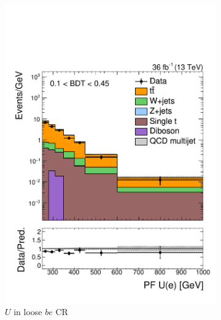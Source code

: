 \begin{figure}[]
    \begin{center}
        \begin{subfigure}[t]{0.32\textwidth}
            \includegraphics[width=\textwidth]{figures/monotop/prefit/singleelectrontop_loose_pfUWmag_logy.pdf}
            \caption{$U$ in loose $be$ CR}
        \end{subfigure}
        \begin{subfigure}[t]{0.32\textwidth}

\end{subfigure}
\end{center}
\end{figure}
